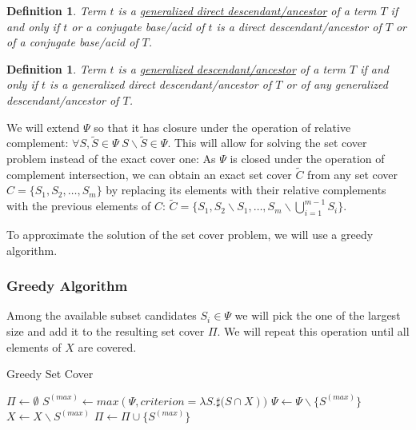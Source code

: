 \documentclass[10pt]{bmc_article}
\newenvironment{bmcformat}{\baselineskip20pt\sloppy\setboolean{publ}{false}}{\baselineskip20pt\sloppy}
\begin{document}
\begin{bmcformat}
\newtheorem{dirgent}[def]{Definition}
\begin{dirgent}
Term $t$ is a \underline{generalized direct descendant/ancestor} of a term $T$ if and only if $t$ or a conjugate base/acid of $t$ is a direct descendant/ancestor of $T$ or of a conjugate base/acid of $T$.
\end{dirgent} 

\newtheorem{gent}[def]{Definition}
\begin{gent}
Term $t$ is a \underline{generalized descendant/ancestor} of a term $T$ if and only if $t$ is a generalized direct descendant/ancestor of $T$ or of any generalized descendant/ancestor of $T$.
\end{gent} 



We will extend $\Psi$ so that it has closure under the operation of relative complement: $\forall S,\tilde{S} \in \Psi \; S\backslash\tilde{S} \in \Psi$. This will allow for solving the set cover problem instead of the exact cover one:  As $\Psi$ is closed under the operation of complement intersection, we can obtain an exact set cover $\tilde{C}$ from any set cover $C = \{S_1, S_2, \ldots, S_m\}$ by replacing its elements with their relative complements with the previous elements of $C$: $\tilde{C} = \{S_1, S_2 \backslash S_1, \ldots, S_m \backslash \bigcup^{m - 1}_{i = 1}{S_i}\}$.

To approximate the solution of the set cover problem, we will use a greedy algorithm.

\subsubsection*{Greedy Algorithm}
Among the available subset candidates $S_i \in \Psi$ we will pick the one of the largest size and add it to the resulting set cover $\Pi$. We will repeat this operation until all elements of $X$ are covered. \\

\begin{algorithm}[H]
\SetAlgoVlined
{}
\caption{Greedy Set Cover}
\BlankLine
\BlankLine
$\Pi \leftarrow \emptyset$ 
\BlankLine
\BlankLine
{} {
	$S^{(max)} \leftarrow max(\Psi, criterion=\lambda{S}.\sharp{(S\cap{X}}))$ \;
	\BlankLine
	$\Psi \leftarrow \Psi\backslash\{S^{(max)}\}$ \;
	$X \leftarrow X\backslash{S^{(max)}}$ \;
	$\Pi \leftarrow \Pi\cup\{S^{(max)}\}$ \;
}
\BlankLine
\KwRet{$\Pi$}
\end{algorithm} 


\end{bmcformat}
\end{document}
